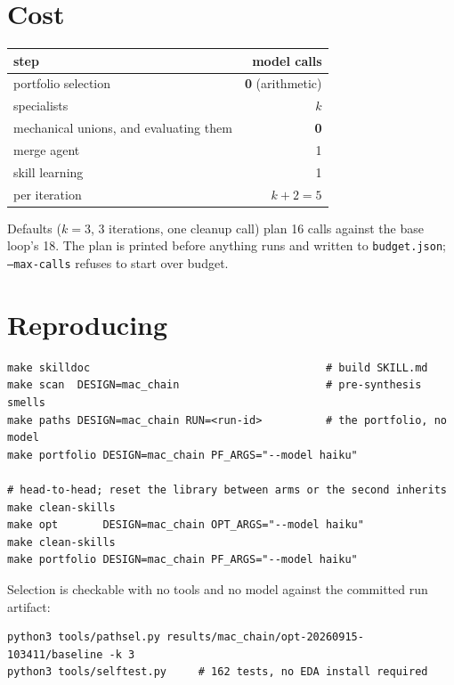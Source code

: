 \documentclass[11pt,a4paper]{article}
\begin{document}
\section{Cost}

\begin{center}
\begin{tabular}{@{}lr@{}}
\toprule
step & model calls \\
\midrule
portfolio selection & \textbf{0} (arithmetic) \\
specialists & $k$ \\
mechanical unions, and evaluating them & \textbf{0} \\
merge agent & 1 \\
skill learning & 1 \\
\midrule
per iteration & $k+2 = 5$ \\
\bottomrule
\end{tabular}
\end{center}

\noindent
Defaults ($k=3$, 3 iterations, one cleanup call) plan 16 calls against the base
loop's 18. The plan is printed before anything runs and written to
\texttt{budget.json}; \texttt{--max-calls} refuses to start over budget.

\section{Reproducing}

\begin{lstlisting}
make skilldoc                                     # build SKILL.md
make scan  DESIGN=mac_chain                       # pre-synthesis smells
make paths DESIGN=mac_chain RUN=<run-id>          # the portfolio, no model
make portfolio DESIGN=mac_chain PF_ARGS="--model haiku"

# head-to-head; reset the library between arms or the second inherits
make clean-skills
make opt       DESIGN=mac_chain OPT_ARGS="--model haiku"
make clean-skills
make portfolio DESIGN=mac_chain PF_ARGS="--model haiku"
\end{lstlisting}

\noindent
Selection is checkable with no tools and no model against the committed run
artifact:

\begin{lstlisting}
python3 tools/pathsel.py results/mac_chain/opt-20260915-103411/baseline -k 3
python3 tools/selftest.py     # 162 tests, no EDA install required
\end{lstlisting}
\end{document}
